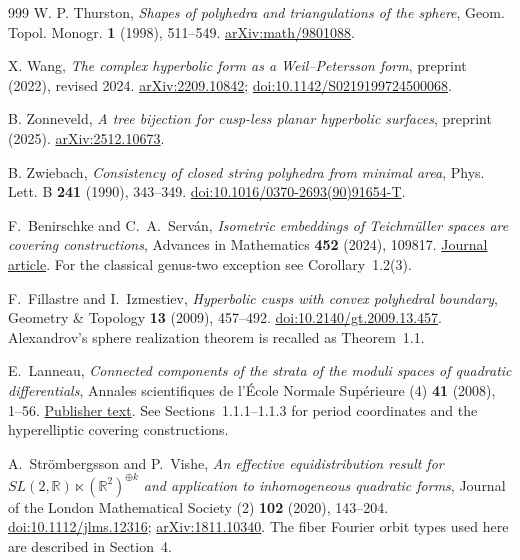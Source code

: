 \documentclass[11pt,a4paper]{article}
\numberwithin{equation}{section}
\theoremstyle{definition}
\theoremstyle{remark}
\newcommand{\RR}{\mathbb R}
\begin{document}
\begin{thebibliography}{999}
W. P. Thurston,
\emph{Shapes of polyhedra and triangulations of the sphere},
Geom. Topol. Monogr. \textbf{1} (1998), 511--549.
\href{https://arxiv.org/abs/math/9801088}{arXiv:math/9801088}.

X. Wang,
\emph{The complex hyperbolic form as a Weil--Petersson form},
preprint (2022), revised 2024.
\href{https://arxiv.org/abs/2209.10842}{arXiv:2209.10842};
\href{https://doi.org/10.1142/S0219199724500068}{doi:10.1142/S0219199724500068}.

B. Zonneveld,
\emph{A tree bijection for cusp-less planar hyperbolic surfaces},
preprint (2025).
\href{https://arxiv.org/abs/2512.10673}{arXiv:2512.10673}.

B. Zwiebach,
\emph{Consistency of closed string polyhedra from minimal area},
Phys. Lett. B \textbf{241} (1990), 343--349.
\href{https://doi.org/10.1016/0370-2693(90)91654-T}{doi:10.1016/0370-2693(90)91654-T}.

F.~Benirschke and C.~A.~Serv\'an,
\emph{Isometric embeddings of Teichm\"uller spaces are covering constructions},
Advances in Mathematics \textbf{452} (2024), 109817.
\href{https://doi.org/10.1016/j.aim.2024.109817}{Journal article}.
For the classical genus-two exception see Corollary~1.2(3).

F.~Fillastre and I.~Izmestiev,
\emph{Hyperbolic cusps with convex polyhedral boundary},
Geometry \& Topology \textbf{13} (2009), 457--492.
\href{https://doi.org/10.2140/gt.2009.13.457}{doi:10.2140/gt.2009.13.457}.
Alexandrov's sphere realization theorem is recalled as Theorem~1.1.

E.~Lanneau,
\emph{Connected components of the strata of the moduli spaces of quadratic differentials},
Annales scientifiques de l'\'Ecole Normale Sup\'erieure (4)
\textbf{41} (2008), 1--56.
\href{https://www.numdam.org/item/ASENS_2008_4_41_1_1_0/}{Publisher text}.
See Sections~1.1.1--1.1.3 for period coordinates and the hyperelliptic covering constructions.

A.~Str\"ombergsson and P.~Vishe,
\emph{An effective equidistribution result for
$SL(2,\RR)\ltimes(\RR^2)^{\oplus k}$ and application to
inhomogeneous quadratic forms},
Journal of the London Mathematical Society (2) \textbf{102} (2020), 143--204.
\href{https://doi.org/10.1112/jlms.12316}{doi:10.1112/jlms.12316};
\href{https://arxiv.org/abs/1811.10340}{arXiv:1811.10340}.
The fiber Fourier orbit types used here are described in Section~4.


\end{thebibliography}
\end{document}
